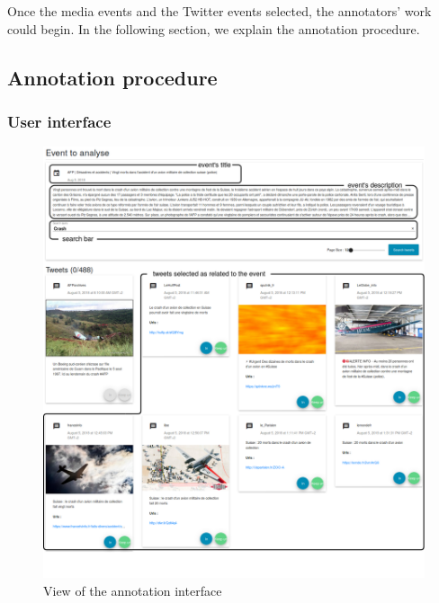 Once the media events and the Twitter events selected, the annotators' work could begin. In the following section, we explain the annotation procedure.
		\subsection{Annotation procedure}
		\subsubsection{User interface}
		
\begin{figure}
\begin{center}
\includegraphics[width=1\textwidth]{figures/Crash_with_comments.png}
\end{center}

\caption{View of the annotation interface}
\label{Figure:Interface}
\end{figure}
